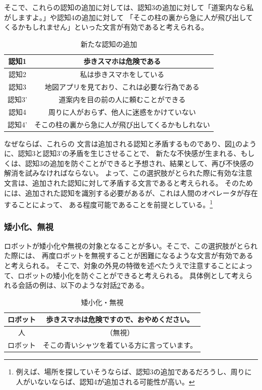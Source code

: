 \documentclass[11pt,a4j]{jreport}
\begin{document}
そこで、これらの認知の追加に対しては、認知3の追加に対して「道案内なら私がしますよ。」や認知4の追加に対して
「そこの柱の裏から急に人が飛び出してくるかもしれません」といった文言が有効であると考えられる。
\begin{table}[h]
  \centering
  
  \label{fig: AvoidDissonanceBlock}
  \begin{tabular}{c|c}
      認知1 & 歩きスマホは危険である \\ \hline
      認知2 & 私は歩きスマホをしている \\ \hline
      認知3 & 地図アプリを見ており、これは必要な行為である \\
      認知3' & 道案内を目の前の人に頼むことができる \\ \hline
      認知4 & 周りに人がおらず、他人に迷惑をかけていない \\ 
      認知4' & そこの柱の裏から急に人が飛び出してくるかもしれない \\ 
  \end{tabular}
  \caption{新たな認知の追加}
\end{table}
なぜならば、これらの
文言は追加される認知と矛盾するものであり、図\ref{fig: AvoidDissonanceBlock}のように、認知3と認知3'の矛盾を生じさせることで、
新たな不快感が生まれる、もしくは、認知3の追加を防ぐことができると予想され、結果として、再び不快感の解消を試みなければならない。
よって、この選択肢がとられた際に有効な注意文言は、追加された認知に対して矛盾する文言であると考えられる。
そのためには、追加された認知を識別する必要があるが、これは人間のオペレータが存在することによって、
ある程度可能であることを前提としている。\footnote[1]{例えば、場所を探していそうならば、認知3の追加であるだろうし、周りに人がいないならば、認知4が追加される可能性が高い。}


\subsubsection{矮小化、無視}
ロボットが矮小化や無視の対象となることが多い\cite{Schneider2022}。そこで、この選択肢がとられた際には、
再度ロボットを無視することが困難になるような文言が有効であると考えられる。
そこで、対象の外見の特徴を述べたうえで注意することによって、ロボットの矮小化を防ぐことができると考えられる。
具体例として考えられる会話の例は、以下のような対話\ref{dialogue: Ignore}である。
\begin{table}[h]
  \centering
  
  \label{dialogue: Ignore}
  \begin{tabular}{c|c}
      ロボット & 歩きスマホは危険ですので、おやめください。 \\ \hline
      人 & （無視） \\ \hline
      ロボット & そこの青いシャツを着ている方に言っています。 \\ 
  \end{tabular}
  \caption{矮小化・無視}
\end{table}
\end{document}
